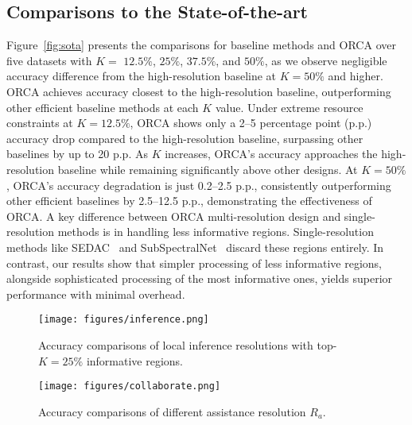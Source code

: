 \subsection{Comparisons to the State-of-the-art}
\label{sec:comparisons-to-the-state-of-the-art}
Figure~\ref{fig:sota} presents the comparisons for baseline methods and ORCA over five datasets with $K=$ $12.5\%$, $25\%$, $37.5\%$, and $50\%$, as we observe negligible accuracy difference from the high-resolution baseline at $K=50\%$ and higher.
ORCA achieves accuracy closest to the high-resolution baseline, outperforming other efficient baseline methods at each $K$ value. Under extreme resource constraints at $K=12.5\%$, ORCA shows only a 2–5 percentage point (p.p.) accuracy drop compared to the high-resolution baseline, surpassing other baselines by up to 20 p.p. As $K$ increases, ORCA’s accuracy approaches the high-resolution baseline while remaining significantly above other designs. At $K=50\%$, ORCA’s accuracy degradation is just 0.2–2.5 p.p., consistently outperforming other efficient baselines by 2.5–12.5 p.p., demonstrating the effectiveness of ORCA. A key difference between ORCA multi-resolution design and single-resolution methods is in handling less informative regions. Single-resolution methods like SEDAC~\cite{ahn2024split} and SubSpectralNet~\cite{phaye2019subspectralnet} discard these regions entirely. In contrast, our results show that simpler processing of less informative regions, alongside sophisticated processing of the most informative ones, yields superior performance with minimal overhead.

\begin{figure}[tp]
    \centering
    \texttt{[image: figures/inference.png]}
    \vspace{-0.5cm}
    \caption{Accuracy comparisons of local inference resolutions with top-$K=25\%$ informative regions. }
    \vspace{-0.5cm}
    \label{fig:inference}
\end{figure}

\begin{figure}[tp]
    \centering
    \texttt{[image: figures/collaborate.png]}
    \vspace{-0.5cm}
    \caption{Accuracy comparisons of different assistance resolution $R_a$. }
    \label{fig:collaborate}
    \vspace{-0.6cm}
\end{figure}



